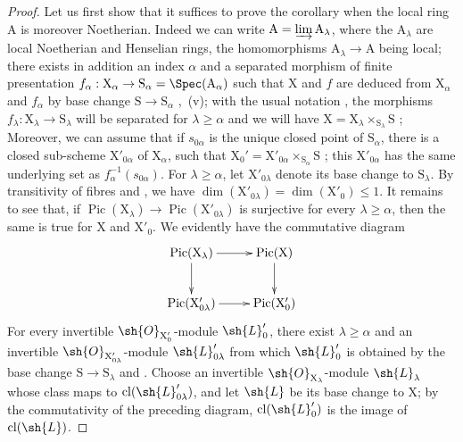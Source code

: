 \begin{proof}
Let us first show that it suffices to prove the corollary when the local ring $\mathrm{A}$ is moreover Noetherian.
Indeed  we can write $\mathrm{A}=\varinjlim\mathrm{A}_\lambda$, where the $\mathrm{A}_\lambda$ are local Noetherian and Henselian rings, the homomorphisms $\mathrm{A}_\lambda\to\mathrm{A}$ being local;
there exists in addition an index $\alpha$ and a separated morphism of finite presentation $f_\alpha:\mathrm{X}_\alpha\to\mathrm{S}_\alpha=\Spec(\mathrm{A}_\alpha)$ such that $\mathrm{X}$ and $f$ are deduced from $\mathrm{X}_\alpha$ and $f_\alpha$ by base change $\mathrm{S}\to\mathrm{S}_\alpha$ ,{}~(v);
with the usual notation , the morphisms $f_\lambda:\mathrm{X}_\lambda\to\mathrm{S}_\lambda$ will be separated for $\lambda\geq\alpha$ and we will have $\mathrm{X}=\mathrm{X}_\lambda\times_{\mathrm{S}_\lambda}\mathrm{S}$ ;
Moreover, we can assume that if $s_{0\alpha}$ is the unique closed point of $\mathrm{S}_\alpha$, there is a closed sub-scheme $\mathrm{X}'_{0\alpha}$ of $\mathrm{X}_\alpha$, such that $\mathrm{X}_0'=\mathrm{X}'_{0\alpha}\times_{\mathrm{S}_\alpha}\mathrm{S}$ ;
this $\mathrm{X}'_{0\alpha}$ has the same underlying set as $f_\alpha^{-1}(s_{0\alpha})$.
For $\lambda\geq\alpha$, let $\mathrm{X}'_{0\lambda}$ denote its base change to $\mathrm{S}_\lambda$.
By transitivity of fibres and , we have $\dim(\mathrm{X}'_{0\lambda})=\dim(\mathrm{X}'_0)\leq1$.
It remains to see that, if $\operatorname{Pic}(\mathrm{X}_\lambda)\to\operatorname{Pic}(\mathrm{X}'_{0\lambda})$ is surjective for every $\lambda\geq\alpha$, then the same is true for $\mathrm{X}$ and $\mathrm{X}'_0$.
We evidently have the commutative diagram
\[
  \xymatrix{
    \operatorname{Pic}(\mathrm{X}_\lambda) \ar[r] \ar[d] & \operatorname{Pic}(\mathrm{X}) \ar[d]\\
    \operatorname{Pic}(\mathrm{X}'_{0\lambda}) \ar[r] & \operatorname{Pic}(\mathrm{X}_0')
  }
\]
For every invertible $\sh{O}_{\mathrm{X}'_0}$-module $\sh{L}'_0$, there exist $\lambda\geq\alpha$ and an invertible $\sh{O}_{\mathrm{X}'_{0\lambda}}$-module $\sh{L}'_{0\lambda}$ from which $\sh{L}'_0$ is obtained by the base change $\mathrm{S}\to\mathrm{S}_\lambda$  and .
Choose an invertible $\sh{O}_{\mathrm{X}_\lambda}$-module $\sh{L}_\lambda$ whose class maps to $\operatorname{cl}(\sh{L}'_{0\lambda})$, and let $\sh{L}$ be its base change to $\mathrm{X}$; by the commutativity of the preceding diagram, $\operatorname{cl}(\sh{L}'_0)$ is the image of $\operatorname{cl}(\sh{L})$.


\end{proof}
